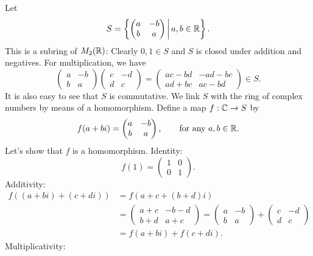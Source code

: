 \documentclass[10pt, a4paper]{article}
\begin{document}
\begin{example}
    Let
    \[
    S = \left\{\begin{pmatrix}
        a & -b \\ b & a
    \end{pmatrix}\,\middle|\,a, b \in \mathbb{R}\right\}.
    \]
    This is a subring of $M_2(\mathbb{R})$:
    Clearly $0, 1 \in S$ and $S$ is closed under addition and negatives.
    For multiplication,
    we have
    \[
    \begin{pmatrix}
        a & -b \\ b & a
    \end{pmatrix}\begin{pmatrix}
        c & -d \\ d & c
    \end{pmatrix} = \begin{pmatrix}
        ac - bd & -ad - bc \\ ad + bc & ac - bd
    \end{pmatrix} \in S.
    \]
    It is also easy to see that $S$ is commutative.
    We link $S$ with the ring of complex numbers by means of a homomorphism.
    Define a map $f : \mathbb{C} \to S$ by
    \[
    f(a + bi) = \begin{pmatrix}
        a & -b \\ b & a
    \end{pmatrix},\qquad\text{for any } a, b \in \mathbb{R}.
    \]
    Let's show that $f$ is a homomorphism.
    Identity:
    \[
    f(1) = \begin{pmatrix}
        1 & 0 \\ 0 & 1
    \end{pmatrix}.
    \]
    Additivity:
    \begin{align*}
        f((a + bi) + (c + di)) &= f(a + c + (b + d)i) \\
        &= \begin{pmatrix}
            a + c & -b - d \\ b + d & a + c
        \end{pmatrix} = \begin{pmatrix}
            a & -b \\ b & a
        \end{pmatrix} + \begin{pmatrix}
            c & -d \\ d & c
        \end{pmatrix} \\
        &= f(a + bi) + f(c + di).
    \end{align*}
    Multiplicativity:

\end{example}
\end{document}
